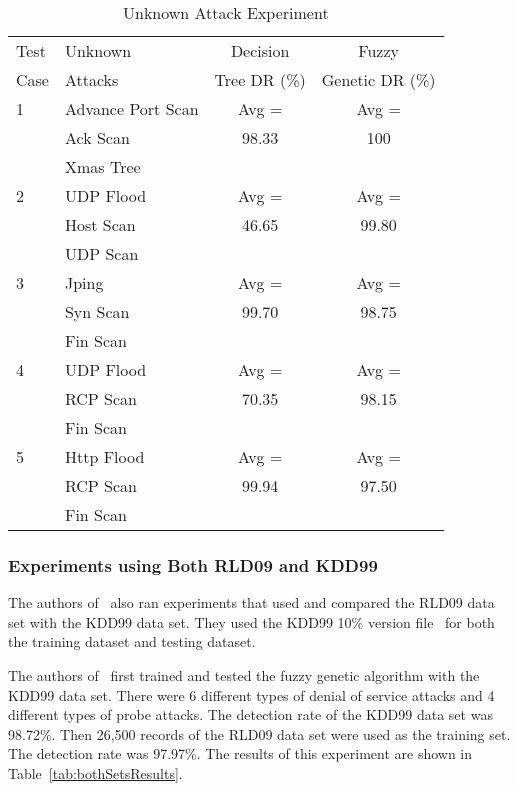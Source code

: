 \documentclass{sig-alternate}
\begin{document}
\begin{table}
\caption{Unknown Attack Experiment}
\begin{tabular}{|llcc|} \hline
Test & Unknown & Decision & Fuzzy\\
Case & Attacks & Tree DR (\%)  & Genetic DR (\%)\\ \hline

1 & Advance Port Scan & Avg = & Avg =\\
  & Ack Scan		  & 98.33 & 100\\
  & Xmas Tree		  &		  &\\ \hline

2 & UDP Flood & Avg = & Avg =\\
  & Host Scan & 46.65 & 99.80\\
  & UDP Scan  &       &\\ \hline

3 & Jping    & Avg =          & Avg =\\
  & Syn Scan & 99.70 & 98.75\\
  & Fin Scan &                &\\ \hline

4 & UDP Flood & Avg = & Avg =\\
  & RCP Scan  & 70.35 & 98.15\\
  & Fin Scan  &       &\\ \hline

5 & Http Flood & Avg =          & Avg =\\
  & RCP Scan  & 99.94 & 97.50\\
  & Fin Scan  &                &\\
\hline\end{tabular}
\label{tab:fuzGenExp2}
\end{table}




\subsubsection{Experiments using Both RLD09 and KDD99}
The authors of~\cite{6496342, 6559603} also ran experiments that used and compared the RLD09 data set with the KDD99 data set. They used the KDD99 10\% version file~\cite{KDD99} for both the training dataset and testing dataset.

The authors of~\cite{6496342, 6559603} first trained and tested the fuzzy genetic algorithm with the KDD99 data set. There were 6 different types of denial of service attacks and 4 different types of probe attacks. The detection rate of the KDD99 data set was 98.72\%. Then 26,500 records of the RLD09 data set were used as the training set. The detection rate was 97.97\%. The results of this experiment are shown in Table~\ref{tab:bothSetsResults}.
\end{document}
